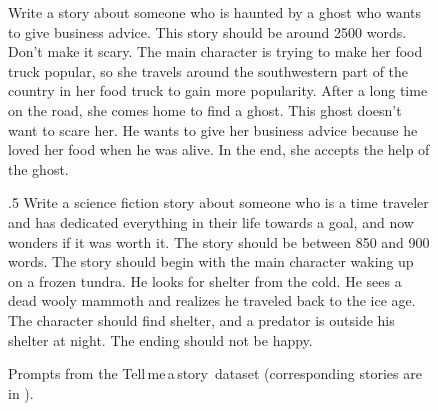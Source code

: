 \documentclass{article}
\newcommand{\tellmeastory}{{\sc Tell$\,$me$\,$a$\,$story}}
\begin{document}
\begin{figure}[t]
\begin{tcolorbox}[colback=white, colframe=my-green, coltitle=black, parskip=5mm,  title=
\textbf{Example Prompts}, breakable, halign=justify]
\vspace*{-.1cm}
  \begin{scriptsize}
{ 
Write a story about someone who is haunted by a ghost who wants to give business advice. This story should be around 2500 words. Don’t make it scary. The main character is trying to make her food truck popular, so she travels around the southwestern part of the country in her food truck to gain more popularity. After a long time on the road, she comes home to find a ghost. This ghost doesn’t want to scare her. He wants to give her business advice because he loved her food when he was alive. In the end, she accepts the help of the ghost.
}
   \tcbline
{ 
\begin{spacing}{.5}
Write a science fiction story about someone who is a time traveler and has dedicated everything in their life towards a goal, and now wonders if it was worth it. The story should be between 850 and 900 words. The story should begin with the main character waking up on a frozen tundra. He looks for shelter from the cold. He sees a dead wooly mammoth and realizes he traveled back to the ice age. The character should find shelter, and a predator is outside his shelter at night. The ending should not be happy.
  \end{spacing}
  }
\end{scriptsize}
\vspace{-.1cm}
\end{tcolorbox}
\vspace{-.2cm}
\centering
\caption{Prompts from the \tellmeastory\ dataset (corresponding stories are in ).\label{fig:prompts}}
\end{figure} 
\end{document}
